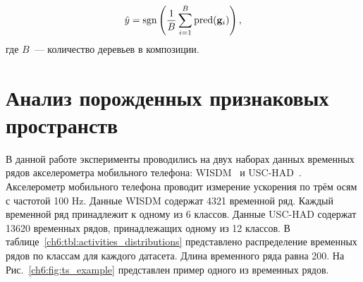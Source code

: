 \begin{equation*}
	\hat{y} = \operatorname{\mathop{sgn}} \left(\frac{1}{B} \sum_{i=1}^{B} \text{pred}(\mathbf{g}_i) \right),
\end{equation*}
где $B$~--- количество деревьев в композиции.


\section{Анализ порожденных признаковых пространств}
\label{sec:ch6:exp_feature_generation}

В данной работе эксперименты проводились на двух наборах данных временных рядов акселерометра мобильного телефона: WISDM~\cite{wisdm} и USC-HAD~\cite{usc}. 
Акселерометр мобильного телефона проводит измерение ускорения по трём осям с частотой 100 Hz.
Данные WISDM содержат 4321 временной ряд.
Каждый временной ряд принадлежит к одному из 6 классов. 
Данные USC-HAD содержат 13620 временных рядов, принадлежащих одному из 12 классов.  
В таблице~\ref{ch6:tbl:activities_distributions} представлено распределение временных рядов по классам для каждого датасета.
Длина временного ряда равна 200.
На Рис.~\ref{ch6:fig:ts_example} представлен пример одного из временных рядов.

